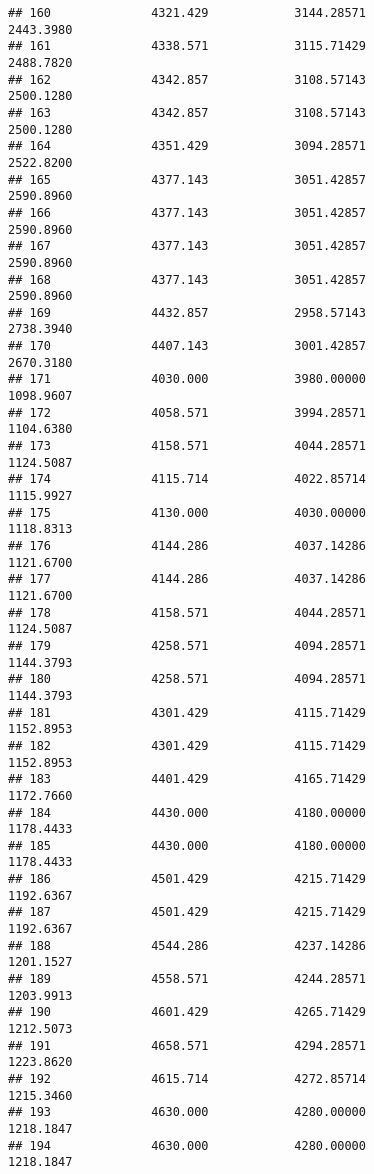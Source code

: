 \documentclass[]{article}
\begin{document}
\begin{verbatim}
## 160              4321.429            3144.28571                2443.3980
## 161              4338.571            3115.71429                2488.7820
## 162              4342.857            3108.57143                2500.1280
## 163              4342.857            3108.57143                2500.1280
## 164              4351.429            3094.28571                2522.8200
## 165              4377.143            3051.42857                2590.8960
## 166              4377.143            3051.42857                2590.8960
## 167              4377.143            3051.42857                2590.8960
## 168              4377.143            3051.42857                2590.8960
## 169              4432.857            2958.57143                2738.3940
## 170              4407.143            3001.42857                2670.3180
## 171              4030.000            3980.00000                1098.9607
## 172              4058.571            3994.28571                1104.6380
## 173              4158.571            4044.28571                1124.5087
## 174              4115.714            4022.85714                1115.9927
## 175              4130.000            4030.00000                1118.8313
## 176              4144.286            4037.14286                1121.6700
## 177              4144.286            4037.14286                1121.6700
## 178              4158.571            4044.28571                1124.5087
## 179              4258.571            4094.28571                1144.3793
## 180              4258.571            4094.28571                1144.3793
## 181              4301.429            4115.71429                1152.8953
## 182              4301.429            4115.71429                1152.8953
## 183              4401.429            4165.71429                1172.7660
## 184              4430.000            4180.00000                1178.4433
## 185              4430.000            4180.00000                1178.4433
## 186              4501.429            4215.71429                1192.6367
## 187              4501.429            4215.71429                1192.6367
## 188              4544.286            4237.14286                1201.1527
## 189              4558.571            4244.28571                1203.9913
## 190              4601.429            4265.71429                1212.5073
## 191              4658.571            4294.28571                1223.8620
## 192              4615.714            4272.85714                1215.3460
## 193              4630.000            4280.00000                1218.1847
## 194              4630.000            4280.00000                1218.1847

\end{verbatim}
\end{document}
